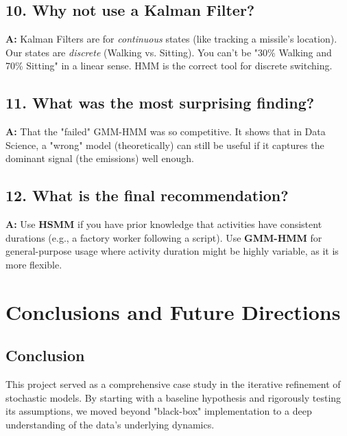 \documentclass[11pt,a4paper]{article}
\begin{document}
\subsection{10. Why not use a Kalman Filter?}
\textbf{A:} Kalman Filters are for \textit{continuous} states (like tracking a missile's location). Our states are \textit{discrete} (Walking vs. Sitting). You can't be "30\% Walking and 70\% Sitting" in a linear sense. HMM is the correct tool for discrete switching.

\subsection{11. What was the most surprising finding?}
\textbf{A:} That the "failed" GMM-HMM was so competitive. It shows that in Data Science, a "wrong" model (theoretically) can still be useful if it captures the dominant signal (the emissions) well enough.

\subsection{12. What is the final recommendation?}
\textbf{A:} Use \textbf{HSMM} if you have prior knowledge that activities have consistent durations (e.g., a factory worker following a script). Use \textbf{GMM-HMM} for general-purpose usage where activity duration might be highly variable, as it is more flexible.

\section{Conclusions and Future Directions}

\subsection{Conclusion}
This project served as a comprehensive case study in the iterative refinement of stochastic models. By starting with a baseline hypothesis and rigorously testing its assumptions, we moved beyond "black-box" implementation to a deep understanding of the data's underlying dynamics.
\end{document}
